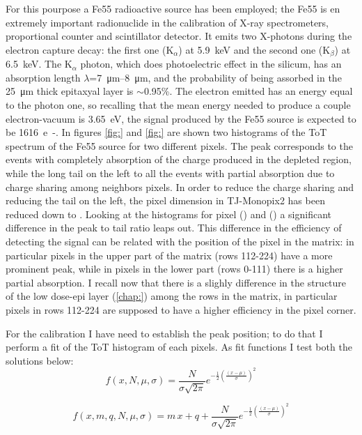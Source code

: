         For this pourpose a Fe55 radioactive source has been employed; the Fe55 is en extremely important radionuclide in the calibration of X-ray spectrometers, proportional counter and scintillator detector. It emits two X-photons during the electron capture decay: the first one (K$_\alpha$) at \SI{5.9}{keV} and the second one (K$_\beta$) at \SI{6.5}{keV}.
        The K$_\alpha$ photon, which does photoelectric effect in the silicum, has an absorption length $\lambda$=\SIrange{7}{8}{\um}, and the probability of being assorbed in the \SI{25}{\um} thick epitaxyal layer is $\sim$0.95\%.
        The electron emitted has an energy equal to the photon one, so recalling that the mean energy needed to produce a couple electron-vacuum is \SI{3.65}{eV}, the signal produced by the Fe55 source is expected to be \SI{1616}{e-}.
        In figures \ref{fig:} and \ref{fig:} are shown two histograms of the ToT spectrum of the Fe55 source for two different pixels. The peak corresponds to the events with completely absorption of the charge produced in the depleted region, while the long tail on the left to all the events with partial absorption due to charge sharing among neighbors pixels. 
        In order to reduce the charge sharing and reducing the tail on the left, the pixel dimension in TJ-Monopix2 has been reduced down to . 
        Looking at the histograms for pixel () and () a significant difference in the peak to tail ratio leaps out. 
        This difference in the efficiency of detecting the signal can be related with the position of the pixel in the matrix: in particular pixels in the upper part of the matrix (rows 112-224) have a more prominent peak, while in pixels in the lower part (rows 0-111) there is a higher partial absorption. 
        I recall now that there is a slighly difference in the structure of the low dose-epi layer (\ref{chap:}) among the rows in the matrix, in particular pixels in rows 112-224 are supposed to have a higher efficiency in the pixel corner. 
        
        For the calibration I have need to establish the peak position; to do that I perform a fit of the ToT histogram of each pixels. As fit functions I test both the solutions below:  
        \begin{equation}
            f(x, N, \mu, \sigma) = \frac{N}{\sigma \sqrt{2\pi}} e^{-\frac{1}{2}(\frac{(x-\mu)}{\sigma})^2}
        \end{equation} 

        \begin{equation}
            f(x, m, q, N, \mu, \sigma) = m\,x + q + \frac{N}{\sigma \sqrt{2\pi}} e^{-\frac{1}{2}(\frac{(x-\mu)}{\sigma})^2}
        \end{equation}          
        
